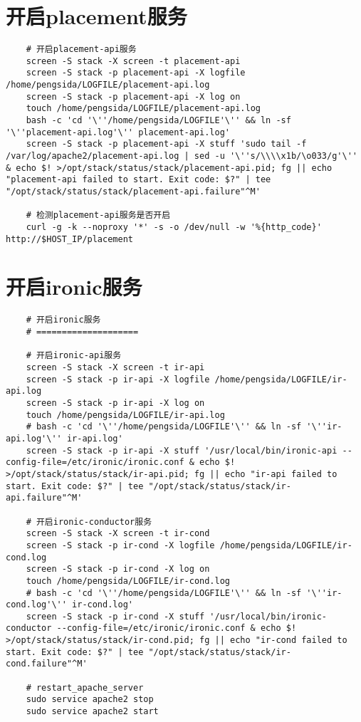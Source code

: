 \documentclass[a4paper,left=1.5cm,right=1.5cm,11pt]{article}
\begin{document}
\section{开启placement服务}
	\begin{lstlisting}
	# 开启placement-api服务
	screen -S stack -X screen -t placement-api
	screen -S stack -p placement-api -X logfile /home/pengsida/LOGFILE/placement-api.log
    screen -S stack -p placement-api -X log on
	touch /home/pengsida/LOGFILE/placement-api.log
    bash -c 'cd '\''/home/pengsida/LOGFILE'\'' && ln -sf '\''placement-api.log'\'' placement-api.log'
	screen -S stack -p placement-api -X stuff 'sudo tail -f /var/log/apache2/placement-api.log | sed -u '\''s/\\\\x1b/\o033/g'\'' & echo $! >/opt/stack/status/stack/placement-api.pid; fg || echo "placement-api failed to start. Exit code: $?" | tee "/opt/stack/status/stack/placement-api.failure"^M'

	# 检测placement-api服务是否开启
	curl -g -k --noproxy '*' -s -o /dev/null -w '%{http_code}' http://$HOST_IP/placement
	\end{lstlisting}

\section{开启ironic服务}
	\begin{lstlisting}
	# 开启ironic服务
	# ====================

	# 开启ironic-api服务
	screen -S stack -X screen -t ir-api
	screen -S stack -p ir-api -X logfile /home/pengsida/LOGFILE/ir-api.log
    screen -S stack -p ir-api -X log on
	touch /home/pengsida/LOGFILE/ir-api.log
    # bash -c 'cd '\''/home/pengsida/LOGFILE'\'' && ln -sf '\''ir-api.log'\'' ir-api.log'
	screen -S stack -p ir-api -X stuff '/usr/local/bin/ironic-api --config-file=/etc/ironic/ironic.conf & echo $! >/opt/stack/status/stack/ir-api.pid; fg || echo "ir-api failed to start. Exit code: $?" | tee "/opt/stack/status/stack/ir-api.failure"^M'

	# 开启ironic-conductor服务
	screen -S stack -X screen -t ir-cond
	screen -S stack -p ir-cond -X logfile /home/pengsida/LOGFILE/ir-cond.log
    screen -S stack -p ir-cond -X log on
	touch /home/pengsida/LOGFILE/ir-cond.log
    # bash -c 'cd '\''/home/pengsida/LOGFILE'\'' && ln -sf '\''ir-cond.log'\'' ir-cond.log'
	screen -S stack -p ir-cond -X stuff '/usr/local/bin/ironic-conductor --config-file=/etc/ironic/ironic.conf & echo $! >/opt/stack/status/stack/ir-cond.pid; fg || echo "ir-cond failed to start. Exit code: $?" | tee "/opt/stack/status/stack/ir-cond.failure"^M'

	# restart_apache_server
	sudo service apache2 stop
	sudo service apache2 start
	\end{lstlisting}
\end{document}
